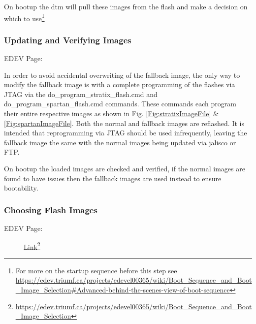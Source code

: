 

On bootup the \gls{dtm} will pull these images from the flash and make a decision on which to use\footnote{For more on the startup sequence before this step see \url{https://edev.triumf.ca/projects/edevel00365/wiki/Boot_Sequence_and_Boot_Image_Selection\#Advanced-behind-the-scenes-view-of-boot-sequence}}

\subsubsection{Updating and Verifying Images}
\begin{description}
\item[EDEV Page: ]
\end{description}

In order to avoid accidental overwriting of the fallback image, the only way to modify the fallback image is with a complete programming of the flashes via JTAG via the do\_program\_stratix\_flash.cmd and do\_program\_spartan\_flash.cmd commands. These commands each program their entire respective images as shown in Fig. \ref{Fig:stratixImageFile} $\&$ \ref{Fig:spartanImageFile}. Both the normal and fallback images are reflashed. It is intended that reprogramming via JTAG should be used infrequently, leaving the fallback image the same with the normal images being updated via \gls{jalisco} or FTP.


On bootup the loaded images are checked and verified, if the normal images are found to have issues then the fallback images are used instead to ensure bootability.

\subsubsection{Choosing Flash Images}
\begin{description}
\item[EDEV Page: ]\href{ https://edev.triumf.ca/projects/edevel00365/wiki/Boot_Sequence_and_Boot_Image_Selection\#Choosing-Which-Image-Will-be-UsedChoosing-which-image-will-be-used-is-done-by-running-a-script-from-the-Nios-Command-Shell-from-the-tsbipscripts-directory-as-usual-To-select-the-normal-image-run-the-following-script}{Link}\footnote{\url{https://edev.triumf.ca/projects/edevel00365/wiki/Boot_Sequence_and_Boot_Image_Selection}}
\end{description}

